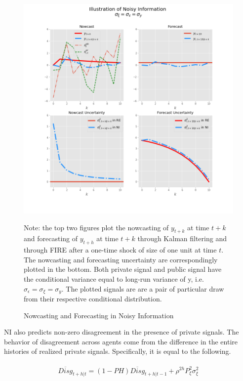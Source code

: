 \documentclass[12pt]{article}
\begin{document}
	\begin{figure}[ht]
		\centering
		\includegraphics[width=13cm]{figures/ni_illustration.png}  \\
		\begin{flushleft}
		{\footnotesize Note: the top two figures plot the nowcasting of $y_{t+k}$  at time $t+k$ and forecasting of $y_{t+h}$ at time $t+k$ through Kalman filtering and through FIRE after a one-time shock of size of one unit at time $t$. The nowcasting and forecasting uncertainty are correspondingly plotted in the bottom. Both private signal and public signal have the conditional variance equal to long-run variance of y, i.e.  $\sigma_\epsilon = \sigma_\xi = \sigma_y$. The plotted signals are are a pair of particular draw from their respective conditional distribution. }
		\end{flushleft}
		\caption{Nowcasting and Forecasting in Noisy Information}
		\label{IllustrateNI}
	\end{figure}
	
	NI also predicts non-zero disagreement in the presence of private signals. The behavior of disagreement across agents come from the difference in the entire histories of realized private signals. Specifically, it is equal to the following. 
	
	\begin{eqnarray}
		\begin{aligned}
			\overline {Disg}_{t+h|t} =  (1-PH) \overline {Disg}_{t+h|t-1} + \rho^{2h} P^2_\xi \sigma^2_\xi 
		\end{aligned}
	\end{eqnarray}
	
\end{document}
